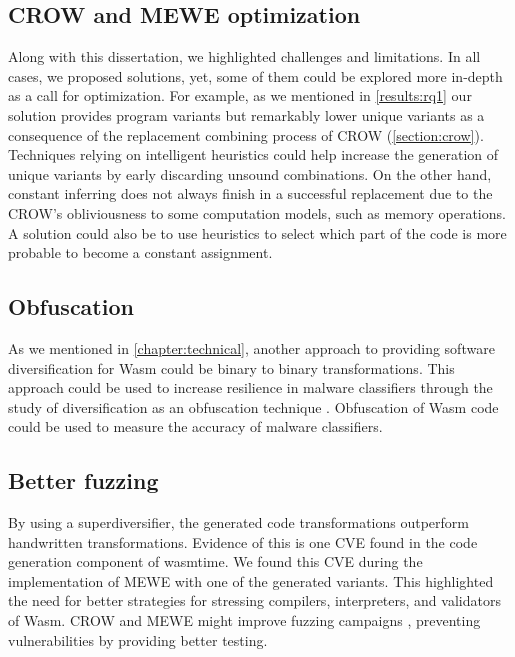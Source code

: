 \subsection*{CROW and MEWE optimization}
Along with this dissertation, we highlighted challenges and limitations. In all cases, we proposed solutions, yet, some of them could be explored more in-depth as a call for optimization. For example,
as we mentioned in \autoref{results:rq1} our solution provides program variants but remarkably lower unique variants as a consequence of the replacement combining process of CROW (\autoref{section:crow}). 
Techniques relying on intelligent heuristics could help increase the generation of unique variants by early discarding unsound combinations.
On the other hand, constant inferring does not always finish in a successful replacement due to the CROW's obliviousness to some computation models, such as memory operations. 
A solution could also be to use heuristics to select which part of the code is more probable to become a constant assignment.


\subsection*{Obfuscation}
As we mentioned in \autoref{chapter:technical}, another approach to providing software diversification for Wasm could be binary to binary transformations. 
This approach could be used to increase resilience in malware classifiers through the study of diversification as an obfuscation technique \cite{10.1145/3507657.3528560}.
Obfuscation of Wasm code could be used to measure the accuracy of malware classifiers.


\subsection*{Better fuzzing}
By using a superdiversifier, the generated code transformations outperform handwritten transformations. Evidence of this is one CVE\cite{CVE} found in the code generation component of wasmtime. 
We found this CVE during the implementation of MEWE with one of the generated variants.
This highlighted the need for better strategies for stressing compilers, interpreters, and validators of Wasm.
CROW and MEWE might improve fuzzing campaigns \cite{zalewski2017american}, preventing vulnerabilities by providing better testing.